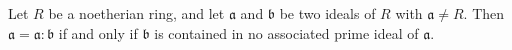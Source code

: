 Let $R$ be a noetherian ring, and let $\mathfrak{a}$ and $\mathfrak{b}$ be two ideals of $R$ with $\mathfrak{a} \neq R$. Then $\mathfrak{a} = \mathfrak{a} : \mathfrak{b}$ if and only if $\mathfrak{b}$ is contained in no associated prime ideal of $\mathfrak{a}$.
